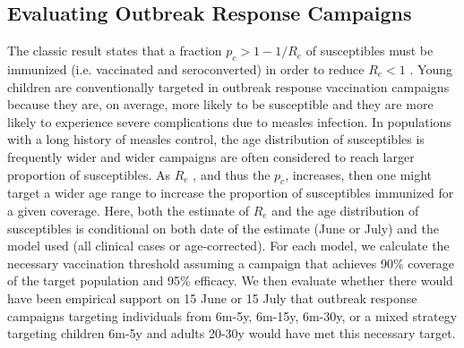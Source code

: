 \subsection{Evaluating Outbreak Response Campaigns}\label{ori}

The classic result states that a fraction \(p_c \gt 1-1/R_e\) of susceptibles must be immunized
(i.e. vaccinated and seroconverted) in order to reduce
\(R_e \lt 1\) \cite{Anderson_1981}. Young
children are conventionally targeted in outbreak response vaccination
campaigns because they are, on average, more likely to be susceptible
and they are more likely to experience severe complications due to
measles infection. In populations with a long history of measles
control, the age distribution of susceptibles is frequently wider \cite{23798689} and wider campaigns are often
considered to reach larger proportion of susceptibles. As
\(R_e\) , and thus the \(p_c\),
increases, then one might target a wider age range to increase the
proportion of susceptibles immunized for a given coverage. Here, both
the estimate of \(R_e\) and the age distribution of
susceptibles is conditional on both date of the estimate (June or July)
and the model used (all clinical cases or age-corrected). For each
model, we calculate the necessary vaccination threshold assuming a
campaign that achieves 90\% coverage of the target population and 95\%
efficacy. We then evaluate whether there would have been empirical
support on 15 June or 15 July that outbreak response campaigns targeting
individuals from 6m-5y, 6m-15y, 6m-30y, or a mixed strategy targeting
children 6m-5y and adults 20-30y would have met this necessary target.